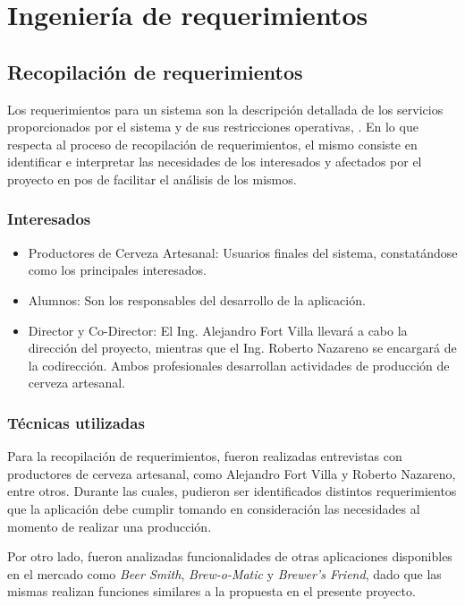\chapter{Ingeniería de requerimientos}
\section{Recopilación de requerimientos}
    \par
    Los requerimientos para un sistema son la descripción detallada de los servicios proporcionados por el sistema y de sus restricciones operativas, \cite{Som05}. En lo que respecta al proceso de recopilación de requerimientos, el mismo consiste en identificar e interpretar las necesidades de los interesados y afectados por el proyecto en pos de facilitar el análisis de los mismos.
    
    \subsection{Interesados}
    \begin{itemize}
        \item Productores de Cerveza Artesanal: Usuarios finales del sistema, constatándose como los principales interesados.
        \item Alumnos: Son los responsables del desarrollo de la aplicación.
        \item Director y Co-Director: El Ing. Alejandro Fort Villa llevará a cabo la dirección del proyecto, mientras que el Ing. Roberto Nazareno se encargará de la codirección. Ambos profesionales desarrollan actividades de producción de cerveza artesanal.
    \end{itemize}
    
    \subsection{Técnicas utilizadas}
    \par
    Para la recopilación de requerimientos, fueron realizadas entrevistas con productores de cerveza artesanal, como Alejandro Fort Villa y Roberto Nazareno, entre otros. Durante las cuales, pudieron ser identificados distintos requerimientos que la aplicación debe cumplir tomando en consideración las necesidades al momento de realizar una producción. 
    \par
    Por otro lado, fueron analizadas funcionalidades de otras aplicaciones disponibles en el mercado como \textit{Beer Smith}\textsuperscript{\textregistered}, \textit{Brew-o-Matic}\textsuperscript{\textregistered} y \textit{Brewer’s Friend}\textsuperscript{\textregistered}, dado que las mismas realizan funciones similares a la propuesta en el presente proyecto.
    
